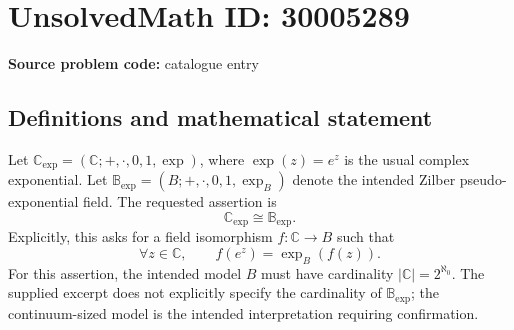 \documentclass[11pt]{article}
\newcommand{\C}{\mathbb{C}}
\begin{document}
\section*{UnsolvedMath ID: 30005289}
\textbf{Source problem code:} catalogue entry
\subsection{Definitions and mathematical statement}
Let \(\mathbb C_{\exp}=(\C;+ ,\cdot,0,1,\exp)\), where \(\exp(z)=e^z\) is the usual complex exponential. Let \(\mathbb B_{\exp}=(B;+ ,\cdot,0,1,\exp_B)\) denote the intended Zilber pseudo-exponential field. The requested assertion is
\[
\mathbb C_{\exp}\cong\mathbb B_{\exp}.
\]
Explicitly, this asks for a field isomorphism \(f:\C\to B\) such that
\[
\forall z\in\C,\qquad f(e^z)=\exp_B(f(z)).
\]
For this assertion, the intended model \(B\) must have cardinality \(|\C|=2^{\aleph_0}\). The supplied excerpt does not explicitly specify the cardinality of \(\mathbb B_{\exp}\); the continuum-sized model is the intended interpretation requiring confirmation.
\end{document}
